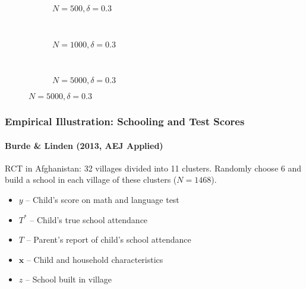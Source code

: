 \documentclass{beamer}
\begin{document}
%  
%  
%  
\begin{frame}
\begin{figure}[h]
  \scriptsize
  \begingroup
  \centering
  \begin{subfigure}[b]{0.31\textwidth}
\caption{\footnotesize $N=500, \delta = 0.3$}
  
  \end{subfigure}
  ~
  \begin{subfigure}[b]{0.31\textwidth}
    \caption{\footnotesize $N=1000, \delta = 0.3$} 
  
  \end{subfigure}
 ~ 
  \begin{subfigure}[b]{0.31\textwidth}
\caption{\footnotesize $N=5000, \delta = 0.3$}
  
  \end{subfigure}
\endgroup
\end{figure}
\end{frame}
\begin{frame}
  \frametitle{Empirical Illustration: Schooling and Test Scores}
\framesubtitle{Burde \& Linden (2013, AEJ Applied)}
  RCT in Afghanistan: 32 villages divided into 11 clusters. Randomly choose 6 and build a school in each village of these clusters ($N = 1468$).

\begin{itemize}
  \item $y$ -- Child's score on math and language test 
  \item $T^*$ -- Child's true school attendance
  \item $T$ -- Parent's report of child's school attendance
  \item $\mathbf{x}$ -- Child and household characteristics
  \item $z$ -- School built in village
\end{itemize}
\end{frame}
\end{document}

